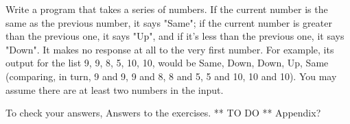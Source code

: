 Write a program that takes
a series of numbers.  If the
current number is the same as the previous number, it says "Same";
if the current number is greater than the previous one, it says "Up",
and if it's less than the previous one, it says "Down".
It makes no response at all to the
very first number.  For example, its output for the list 9, 9, 8, 5, 10, 10,
would be Same, Down, Down, Up, Same
(comparing, in turn, 9 and 9, 9 and 8, 8 and 5, 5 and 10, 10 and 10).
You may assume there are at least two numbers in the input.

To check your answers, Answers to the exercises. ** TO DO ** Appendix?

